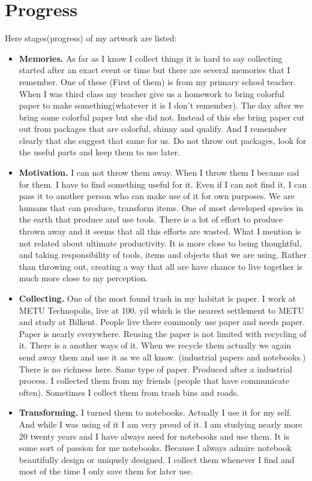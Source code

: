 \section{Progress}
Here stages(progress) of my artwork are listed:
\begin{itemize}
\item \textbf{Memories.} As far as I know I collect things it is hard to say collecting started after an exact event or time but there are several memories that I remember. One of these (First of them) is from my primary school teacher. When I was third class my teacher give us a homework to bring colorful paper to make something(whatever it is I don't remember). The day after we bring some colorful paper but she did not. Instead of this she bring paper cut out from packages that are colorful, shinny and qualify. And I remember clearly that she suggest that same for us. Do not throw out packages, look for the useful parts and keep them to use later. 
\item \textbf{Motivation.} I can not throw them away. When I throw them I became sad for them. I have to find something useful for it. Even if I can not find it, I can pass it to another person who can make use of it for own purposes. We are humans that can produce, transform items. One of most developed species in the earth that produce and use tools. There is a lot of effort to produce thrown away and it seems that all this efforts are wasted. What I mention is not related about ultimate productivity. It is more close to being thoughtful, and taking responsibility of tools, items and objects that we are using. Rather than throwing out, creating a way that all are have chance to live together is much more close to my perception. 
\item \textbf{Collecting.} One of the most found trash in my habitat is paper. I work at METU Technopolis, live at 100. yil which is the nearest settlement to METU and study at Bilkent. People live there commonly use paper and needs paper. Paper is nearly everywhere. Reusing the paper is not limited with recycling of it. There is a another ways of it. When we recycle them actually we again send away them and use it as we all know. (industrial papers and notebooks.) There is no richness here. Same type of paper. Produced after a industrial process. I collected them from my friends (people that have communicate often). Sometimes I collect them from trash bins and roads. 
\item \textbf{Transforming.} I turned them to notebooks. Actually I use it for my self. And while I was using of it I am very proud of it. I am studying nearly more 20 twenty years and I have always need for notebooks and use them. It is some sort of passion for me notebooks. Because I always admire notebook beautifully design or uniquely designed. I collect them whenever I find and most of the time I only save them for later use. 
\end{itemize}


